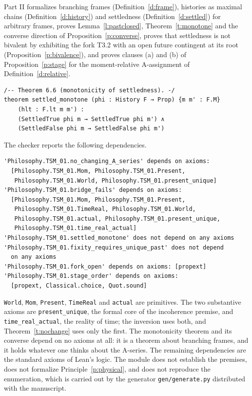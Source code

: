 \documentclass{situationist-preprint}
\begin{document}
Part II formalizes branching frames (Definition~\ref{d:frame}), histories as maximal chains (Definition~\ref{d:history}) and settledness (Definition~\ref{d:settled}) for arbitrary frames, proves Lemma~\ref{l:pastclosed}, Theorem~\ref{t:monotone} and the converse direction of Proposition~\ref{p:converse}, proves that settledness is not bivalent by exhibiting the fork T3.2 with an open future contingent at its root (Proposition~\ref{p:bivalence}), and proves clauses (a) and (b) of Proposition~\ref{p:stage} for the moment-relative A-assignment of Definition~\ref{d:relative}.

\begin{lstlisting}
/-- Theorem 6.6 (monotonicity of settledness). -/
theorem settled_monotone (phi : History F → Prop) {m m' : F.M}
    (hlt : F.lt m m') :
    (SettledTrue phi m → SettledTrue phi m') ∧
    (SettledFalse phi m → SettledFalse phi m')
\end{lstlisting}

The checker reports the following dependencies.
\begin{lstlisting}
'Philosophy.TSM_01.no_changing_A_series' depends on axioms:
  [Philosophy.TSM_01.Mom, Philosophy.TSM_01.Present,
   Philosophy.TSM_01.World, Philosophy.TSM_01.present_unique]
'Philosophy.TSM_01.bridge_fails' depends on axioms:
  [Philosophy.TSM_01.Mom, Philosophy.TSM_01.Present,
   Philosophy.TSM_01.TimeReal, Philosophy.TSM_01.World,
   Philosophy.TSM_01.actual, Philosophy.TSM_01.present_unique,
   Philosophy.TSM_01.time_real_actual]
'Philosophy.TSM_01.settled_monotone' does not depend on any axioms
'Philosophy.TSM_01.fixity_requires_unique_past' does not depend
  on any axioms
'Philosophy.TSM_01.fork_open' depends on axioms: [propext]
'Philosophy.TSM_01.stage_order' depends on axioms:
  [propext, Classical.choice, Quot.sound]
\end{lstlisting}

\texttt{World}, \texttt{Mom}, \texttt{Present}, \texttt{TimeReal} and \texttt{actual} are primitives. The two substantive axioms are \texttt{present\_unique}, the formal core of the incoherence premise, and \texttt{time\_real\_actual}, the reality of time; the inversion uses both, and Theorem~\ref{t:nochange} uses only the first. The monotonicity theorem and its converse depend on no axioms at all: it is a theorem about branching frames, and it holds whatever one thinks about the A-series. The remaining dependencies are the standard axioms of Lean's logic. The module does not establish the premises, does not formalize Principle~\ref{p:physical}, and does not reproduce the enumeration, which is carried out by the generator \texttt{gen/generate.py} distributed with the manuscript.
\end{document}
